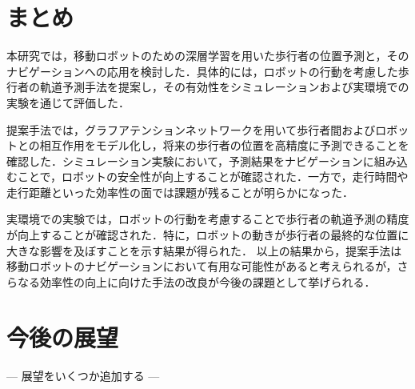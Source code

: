 
\section{まとめ}
本研究では，移動ロボットのための深層学習を用いた歩行者の位置予測と，そのナビゲーションへの応用を検討した．具体的には，ロボットの行動を考慮した歩行者の軌道予測手法を提案し，その有効性をシミュレーションおよび実環境での実験を通じて評価した．

提案手法では，グラフアテンションネットワークを用いて歩行者間およびロボットとの相互作用をモデル化し，将来の歩行者の位置を高精度に予測できることを確認した．シミュレーション実験において，予測結果をナビゲーションに組み込むことで，ロボットの安全性が向上することが確認された．一方で，走行時間や走行距離といった効率性の面では課題が残ることが明らかになった．

実環境での実験では，ロボットの行動を考慮することで歩行者の軌道予測の精度が向上することが確認された．特に，ロボットの動きが歩行者の最終的な位置に大きな影響を及ぼすことを示す結果が得られた．
以上の結果から，提案手法は移動ロボットのナビゲーションにおいて有用な可能性があると考えられるが，さらなる効率性の向上に向けた手法の改良が今後の課題として挙げられる．

\section{今後の展望}

\begin{center}
  ---
  展望をいくつか追加する
  ---
\end{center}

\newpage
